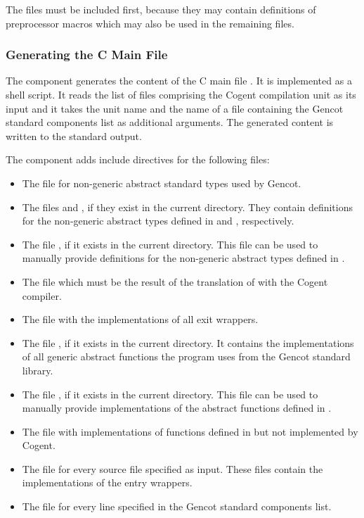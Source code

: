 The files  must be included first, because they may contain definitions of preprocessor macros
which may also be used in the remaining files.

\subsubsection{Generating the C Main File}

The component  generates the content of the C main file . 
It is implemented as a shell script. It reads the list of
 files comprising the Cogent compilation unit as its input and it takes the unit name 
and the name of a file containing the Gencot standard components list as additional arguments. The generated content 
is written to the standard output. 

The component adds include directives for the following files:
\begin{itemize}
\item The file  for non-generic abstract standard types used by Gencot.
\item The files  and , if they exist in the current directory. 
They contain definitions for the non-generic abstract types defined in  and 
, respectively.
\item The file , if it exists in the current directory. This file can be used to
manually provide definitions for the non-generic abstract types defined in .
\item The file  which must be the result of the translation of 
with the Cogent compiler.
\item The file  with the implementations of all exit wrappers.
\item The file , if it exists in the current directory. It contains the 
implementations of all generic abstract functions the program uses from the Gencot standard library.
\item The file , if it exists in the current directory. This file can be used to
manually provide implementations of the abstract functions defined in .
\item The file  with implementations of functions defined in 
but not implemented by Cogent.
\item The file  for every source file  specified as input. These files contain
the implementations of the entry wrappers.
\item The file  for every line  specified in the Gencot standard
components list.
\end{itemize}

